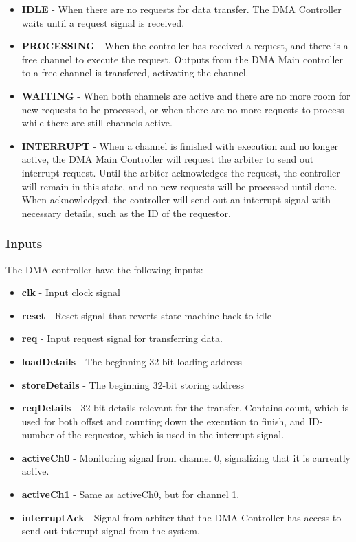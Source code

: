 \begin{itemize}
    \item \textbf{IDLE} - When there are no requests for data transfer.
    The DMA Controller waits until a request signal is received.
    \item \textbf{PROCESSING} - When the controller has received a request, and there is a free channel to execute the request.
    Outputs from the DMA Main controller to a free channel is transfered, activating the channel.
    \item \textbf{WAITING} - When both channels are active and there are no more room for new requests to be processed, or when there are no more requests to process while there are still channels active.
    \item \textbf{INTERRUPT} - When a channel is finished with execution and no longer active, the DMA Main Controller will request the arbiter to send out interrupt request.
    Until the arbiter acknowledges the request, the controller will remain in this state, and no new requests will be processed until done.
    When acknowledged, the controller will send out an interrupt signal with necessary details, such as the ID of the requestor.  
\end{itemize}

\subsubsection{Inputs}
The DMA controller have the following inputs:

\begin{itemize}
    \item \textbf{clk} - Input clock signal
    \item \textbf{reset} - Reset signal that reverts state machine back to idle
    \item \textbf{req} - Input request signal for transferring data.
    \item \textbf{loadDetails} - The beginning 32-bit loading address
    \item \textbf{storeDetails} - The beginning 32-bit storing address
    \item \textbf{reqDetails} - 32-bit details relevant for the transfer.
    Contains count, which is used for both offset and counting down the execution to finish, and ID-number of the requestor, which is used in the interrupt signal.
    \item \textbf{activeCh0} - Monitoring signal from channel 0, signalizing that it is currently active.
    \item \textbf{activeCh1} - Same as activeCh0, but for channel 1.
    \item \textbf{interruptAck} - Signal from arbiter that the DMA Controller has access to send out interrupt signal from the system.
\end{itemize}

